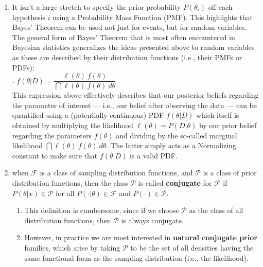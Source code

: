 \begin{enumerate}
    \item It isn’t a large stretch to specify the prior probability $P(\theta_i )$ off each hypothesis $i$ using a Probability Mass Function (PMF). 
    This highlights that Bayes’ Theorem can be used not just for events, but for random variables. 
    The general form of Bayes’ Theorem that is most often encountered in Bayesian statistics generalizes the ideas presented above to random variables as these are described by their distribution functions (i.e., their PMFs or PDFs):
    \hfill \cite{statistics/book/Statistics-for-Data-Scientists/Maurits-Kaptein}
    \\[0.2cm]
    .\hfill
    $
        f (\theta|D) = \dfrac{\ell(\theta)\ f (\theta)}{\dint \ell(\theta)\ f (\theta)\ d\theta}
    $
    \hfill \cite{statistics/book/Statistics-for-Data-Scientists/Maurits-Kaptein}
    \\
    This expression above effectively describes that our posterior beliefs regarding the parameter of interest — i.e., our belief after observing the data — can be quantified using a (potentially continuous) PDF $f (\theta|D)$ which itself is obtained by multiplying the likelihood $\ell(\theta) = P(D|\theta)$ by our prior belief regarding the parameters $f (\theta)$ and dividing by the so-called marginal likelihood $\dint \ell(\theta)\ f (\theta)\ d\theta$. 
    The latter simply acts as a Normalizing constant to make sure that $f (\theta|D)$ is a valid PDF.
    \hfill \cite{statistics/book/Statistics-for-Data-Scientists/Maurits-Kaptein}

    \item when $\mathcal{F}$ is a class of sampling distribution functions, and $\mathcal{P}$ is a class of prior distribution functions, then the class $\mathcal{P}$ is called \textbf{conjugate} for $\mathcal{F}$ if $P(\theta|x) \in \mathcal{P}$ for all $P(\cdot|\theta) \in \mathcal{F}$ and $P(\cdot) \in \mathcal{P}$.
    \hfill \cite{statistics/book/Statistics-for-Data-Scientists/Maurits-Kaptein}
    \begin{enumerate}
        \item This definition is cumbersome, since if we choose $\mathcal{P}$ as the class of all distribution functions, then $\mathcal{P}$ is always conjugate. 
        \hfill \cite{statistics/book/Statistics-for-Data-Scientists/Maurits-Kaptein}
        
        \item However, in practice we are most interested in \textbf{natural conjugate prior} families, which arise by taking $\mathcal{P}$ to be the set of all densities having the same functional form as the sampling distribution (i.e., the likelihood).
        \hfill \cite{statistics/book/Statistics-for-Data-Scientists/Maurits-Kaptein}
    \end{enumerate}
\end{enumerate}


